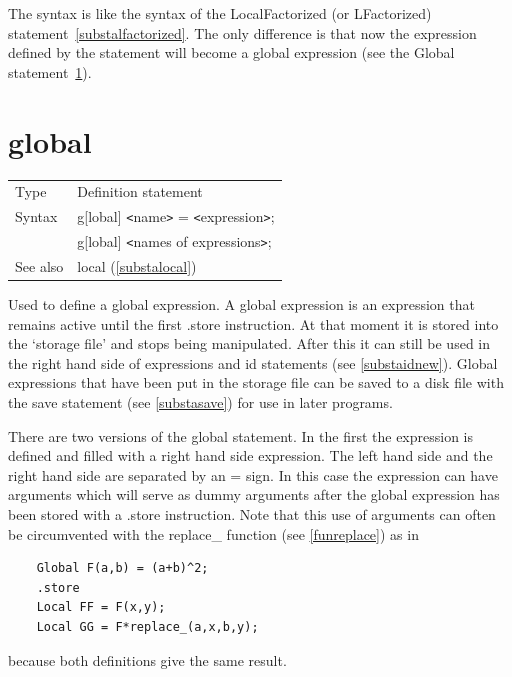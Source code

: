 \noindent The syntax is like the syntax of the LocalFactorized (or 
LFactorized) statement~\ref{substalfactorized}. The only difference is that 
now the expression defined by the statement will become a global 
expression (see the Global statement~\ref{substaglobal}).
\vspace{10mm}


\section{global}
\label{substaglobal}

\noindent \begin{tabular}{ll}
Type & Definition statement\\
Syntax & g[lobal] {\tt<}name{\tt>} = {\tt<}expression{\tt>}; \\
       & g[lobal] {\tt<}names of expressions{\tt>};
\\ See also & local (\ref{substalocal})
\end{tabular} \vspace{4mm}

\noindent Used to define a global 
expression. A global expression is an expression that 
remains active until the first .store instruction. At that 
moment it is stored into the `storage file' and stops being manipulated. After this it can 
still be used in the right hand side of expressions and id 
statements (see \ref{substaidnew}). Global expressions that have been put 
in the storage file can be saved to a disk file with the 
save statement (see \ref{substasave}) for use in later programs.

\noindent There are two versions of the global statement. In the first the 
expression is defined and filled with a right hand side expression. The left 
hand side and the right hand side are separated by an = sign. In this case 
the expression can have arguments which will serve as
dummy arguments after the global expression has been 
stored with a .store instruction. Note that this use of arguments can often 
be circumvented with the replace\_ function (see \ref{funreplace}) as in
\begin{verbatim}
    Global F(a,b) = (a+b)^2;
    .store
    Local FF = F(x,y);
    Local GG = F*replace_(a,x,b,y);
\end{verbatim}
because both definitions give the same result.

